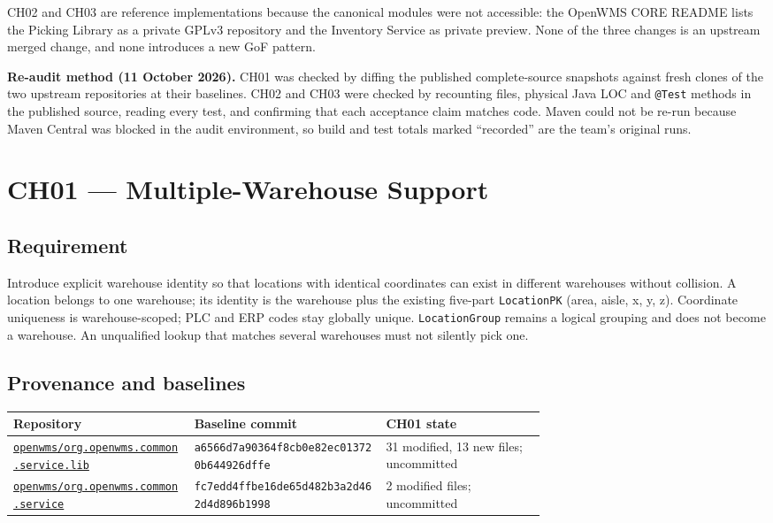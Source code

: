 \documentclass[11pt,a4paper]{article}
\newcommand{\code}[1]{\nolinkurl{#1}}
\begin{document}
CH02 and CH03 are reference implementations because the canonical modules were not accessible: the OpenWMS CORE README lists the Picking Library as a private GPLv3 repository and the Inventory Service as private preview. None of the three changes is an upstream merged change, and none introduces a new GoF pattern.

\textbf{Re-audit method (11 October 2026).} CH01 was checked by diffing the published complete-source snapshots against fresh clones of the two upstream repositories at their baselines. CH02 and CH03 were checked by recounting files, physical Java LOC and \code{@Test} methods in the published source, reading every test, and confirming that each acceptance claim matches code. Maven could not be re-run because Maven Central was blocked in the audit environment, so build and test totals marked ``recorded'' are the team's original runs.

\section{CH01 --- Multiple-Warehouse Support}

\subsection{Requirement}
Introduce explicit warehouse identity so that locations with identical coordinates can exist in different warehouses without collision. A location belongs to one warehouse; its identity is the warehouse plus the existing five-part \code{LocationPK} (area, aisle, x, y, z). Coordinate uniqueness is warehouse-scoped; PLC and ERP codes stay globally unique. \code{LocationGroup} remains a logical grouping and does not become a warehouse. An unqualified lookup that matches several warehouses must not silently pick one.

\subsection{Provenance and baselines}
\begin{tabularx}{\linewidth}{@{}P{0.34\linewidth}P{0.36\linewidth}Y@{}}
\toprule
Repository & Baseline commit & CH01 state\\
\midrule
\href{https://github.com/openwms/org.openwms.common.service.lib}{\nolinkurl{openwms/org.openwms.common.service.lib}} & \code{a6566d7a90364f8cb0e82ec013720b644926dffe} & 31 modified, 13 new files; uncommitted\\
\href{https://github.com/openwms/org.openwms.common.service}{\nolinkurl{openwms/org.openwms.common.service}} & \code{fc7edd4ffbe16de65d482b3a2d462d4d896b1998} & 2 modified files; uncommitted\\
\bottomrule
\end{tabularx}
\end{document}
